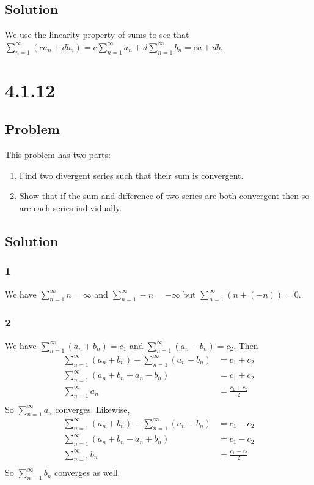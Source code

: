 \documentclass[12pt]{article}
\begin{document}
\subsection*{Solution}
We use the linearity property of sums to see that $\sum_{n=1}^\infty (c a_n + d b_n) = c \sum_{n=1}^\infty a_n + d \sum_{n=1}^\infty b_n = ca + db$.



\section*{4.1.12}

\subsection*{Problem}
This problem has two parts:
\begin{enumerate}
    \item Find two divergent series such that their sum is convergent.
    \item Show that if the sum and difference of two series are both convergent then so are each series individually.
\end{enumerate}

\subsection*{Solution}

\subsubsection*{1}
We have $\sum_{n=1}^\infty n = \infty$ and $\sum_{n=1}^\infty -n = -\infty$ but $\sum_{n=1}^\infty (n + (-n)) = 0$.

\subsubsection*{2}
We have $\sum_{n=1}^\infty (a_n + b_n) = c_1$ and $\sum_{n=1}^\infty (a_n - b_n) = c_2$. Then
\begin{align*}
    \sum_{n=1}^\infty (a_n + b_n) + \sum_{n=1}^\infty (a_n - b_n) &= c_1 + c_2 \\
    \sum_{n=1}^\infty (a_n + b_n + a_n - b_n) &= c_1 + c_2 \\
    \sum_{n=1}^\infty a_n &= \frac{c_1 + c_2}{2} \\
\end{align*}
So $\sum_{n=1}^\infty a_n$ converges. Likewise,
\begin{align*}
    \sum_{n=1}^\infty (a_n + b_n) - \sum_{n=1}^\infty (a_n - b_n) &= c_1 - c_2 \\
    \sum_{n=1}^\infty (a_n + b_n - a_n + b_n) &= c_1 - c_2 \\
    \sum_{n=1}^\infty b_n &= \frac{c_1 - c_2}{2} \\
\end{align*}
So $\sum_{n=1}^\infty b_n$ converges as well.
\end{document}
